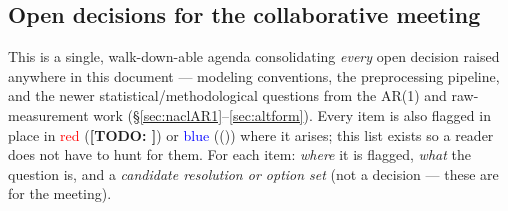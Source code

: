 \documentclass[11pt]{article}
\newcommand{\todo}[1]{{\color{red}\textbf{[TODO: #1]}}}
\newcommand{\note}[1]{{\color{blue}\textsf{(#1)}}}
\begin{document}
\subsection{Open decisions for the collaborative meeting}\label{sec:questions}
This is a single, walk-down-able agenda consolidating \emph{every} open
decision raised anywhere in this document --- modeling conventions, the
preprocessing pipeline, and the newer statistical/methodological questions
from the AR(1) and raw-measurement work (\S\ref{sec:naclAR1}--\ref{sec:altform}).
Every item is also flagged in place in \textcolor{red}{red} (\todo{}) or
\textcolor{blue}{blue} (\note{}) where it arises; this list exists so a reader
does not have to hunt for them. For each item: \emph{where} it is flagged,
\emph{what} the question is, and a \emph{candidate resolution or option set}
(not a decision --- these are for the meeting).
\end{document}
